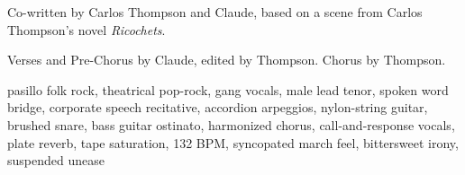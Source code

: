 
\begin{notes}
Co-written by Carlos Thompson and Claude, based on a scene from Carlos Thompson's novel \emph{Ricochets}.

Verses and Pre-Chorus by Claude, edited by Thompson. Chorus by Thompson.
\end{notes}
\begin{style}
pasillo folk rock, theatrical pop-rock, gang vocals, male lead tenor, spoken word bridge, corporate speech recitative, accordion arpeggios, nylon-string guitar, brushed snare, bass guitar ostinato, harmonized chorus, call-and-response vocals, plate reverb, tape saturation, 132 BPM, syncopated march feel, bittersweet irony, suspended unease
\end{style}
